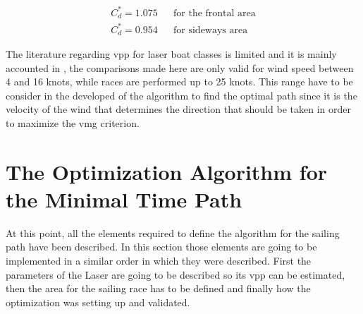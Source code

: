 \begin{subequations} \label{eq:draftMod}
 \begin{align}
  C_{d}^*= 1.075 && \text{for the frontal area} \label{eq:FrontalAreaDraft} \\
  C_{d}^*= 0.954 && \text{for sideways area} \label{eq:SideAreaDraft}
 \end{align}
\end{subequations}

\par 
The literature regarding \acrshort{vpp} for laser boat classes is limited and it is mainly accounted in \cite{day2017performance}, the comparisons made here are only valid for wind speed between  4 and 16 knots, while races are performed up to 25 knots. This range have to be consider in the developed of the algorithm to find the optimal path since it is the velocity of the wind that determines the direction that should be taken in order to maximize the \acrshort{vmg} criterion. \par 

\section{The Optimization Algorithm for the Minimal Time Path}
At this point, all the elements required to define the algorithm for the sailing path have been described. In this section those elements are going to be implemented in a similar order in which they were described. First the parameters of the Laser are going to be described so its \acrshort{vpp} can be estimated, then the area for the sailing race has to be defined and finally how the optimization was setting up and validated. 

